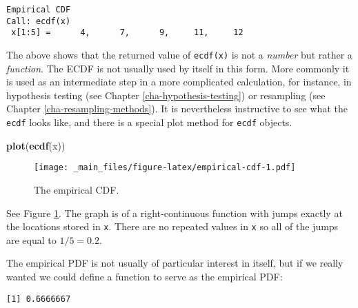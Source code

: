 \documentclass[]{book}
\newenvironment{Shaded}{\begin{snugshade}}{\end{snugshade}}
\newcommand{\KeywordTok}[1]{\textcolor[rgb]{0.13,0.29,0.53}{\textbf{{#1}}}}
\newcommand{\DecValTok}[1]{\textcolor[rgb]{0.00,0.00,0.81}{{#1}}}
\newcommand{\StringTok}[1]{\textcolor[rgb]{0.31,0.60,0.02}{{#1}}}
\newcommand{\CommentTok}[1]{\textcolor[rgb]{0.56,0.35,0.01}{\textit{{#1}}}}
\newcommand{\NormalTok}[1]{{#1}}
\numberwithin{equation}{chapter}
\numberwithin{figure}{chapter}
\theoremstyle{plain}
\theoremstyle{definition}
\theoremstyle{remark}
\theoremstyle{definition}
\theoremstyle{definition}
\theoremstyle{remark}
\begin{document}
\begin{verbatim}
Empirical CDF 
Call: ecdf(x)
 x[1:5] =      4,      7,      9,     11,     12
\end{verbatim}

The above shows that the returned value of \texttt{ecdf(x)} is not a
\emph{number} but rather a \emph{function}. The ECDF is not usually used
by itself in this form. More commonly it is used as an intermediate step
in a more complicated calculation, for instance, in hypothesis testing
(see Chapter \ref{cha-hypothesis-testing}) or resampling (see Chapter
\ref{cha-resampling-methods}). It is nevertheless instructive to see
what the \texttt{ecdf} looks like, and there is a special plot method
for \texttt{ecdf} objects.

\begin{Shaded}
\begin{Highlighting}[]
\KeywordTok{plot}\NormalTok{(}\KeywordTok{ecdf}\NormalTok{(x))}
\end{Highlighting}
\end{Shaded}

\begin{figure}[htbp]
\centering
\texttt{[image: \_main\_files/figure-latex/empirical-cdf-1.pdf]}
\caption{\label{fig:empirical-cdf}\small The empirical CDF.}
\end{figure}



See Figure \ref{fig:empirical-cdf}. The graph is of a right-continuous
function with jumps exactly at the locations stored in \texttt{x}. There
are no repeated values in \texttt{x} so all of the jumps are equal to
\(1/5=0.2\).

The empirical PDF is not usually of particular interest in itself, but
if we really wanted we could define a function to serve as the empirical
PDF:

\begin{Shaded}
\end{Shaded}

\begin{verbatim}
[1] 0.6666667
\end{verbatim}
\end{document}
